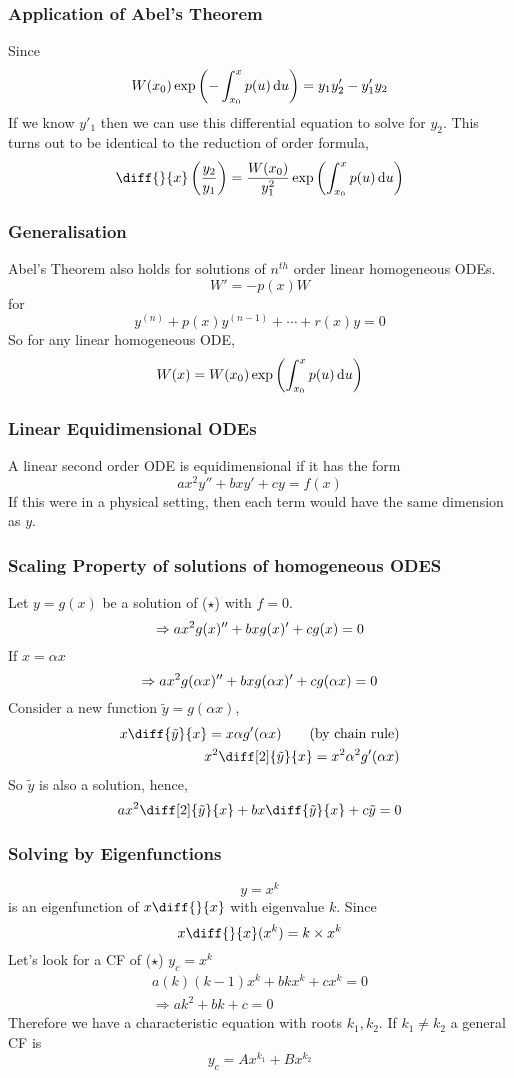 \documentclass{article}
\begin{document}
\subsubsection*{Application of Abel's Theorem}
Since
\[
    W(x_0) \exp \left( -\int_{x_0}^{x}{p(u) \mathop{}\!\mathrm{d} u} \right) = y_1 y_2' - y'_1 y_2
\]
If we know $y'_1$ then we can use this differential equation to solve for $y_2$.
This turns out to be identical to the reduction of order formula,
\[
    \diff {}{x} \bkt{\frac{y_2}{y_1}} = \frac{W(x_0)}{y_1^2} \exp \bkt{\int_{x_0}^{x}{p(u) \diffd u}} 
\]
\subsubsection*{Generalisation}
Abel's Theorem also holds for solutions of $n^{th}$ order linear homogeneous ODEs.
\[
    W' = -p(x)W 
\]
for
\[
    y^{(n)} + p(x) y^{(n-1)} + \cdots + r(x) y = 0
\]
So for any linear homogeneous ODE,
\[
    W(x) = W(x_0) \exp \left( \int_{x_0}^{x}{p(u) \mathop{}\!\mathrm{d} u} \right)
\]
\subsubsection{Linear Equidimensional ODEs}
\begin{defi}
    A linear second order ODE is equidimensional if it has the form 
    \[
        a x^2 y'' + bx y' + cy = f(x) \tag{$\star$}  
    \]
    If this were in a physical setting, then each term would have the same dimension as $y$.
\end{defi}
\subsubsection*{Scaling Property of solutions of homogeneous ODES}
Let $y = g(x)$ be a solution of ($\star$) with $f = 0$.
\[
    \Rightarrow  a x^2 g(x)'' + bx g(x)' + cg(x) = 0 \\
\]
If $x = \alpha x$
\[
    \Rightarrow  a x^2 g(\alpha x)'' + bx g(\alpha x)' + cg(\alpha x) = 0 \\
\]
Consider a new function $\tilde{y} = g(\alpha x)$,
\begin{align*}
    x \diff {\tilde{y}}{x} = x \alpha g'(\alpha x) \tag{by chain rule}\\
    x^2 \diff[2] {\tilde{y}}{x} = x^2 \alpha^2 g'(\alpha x)
\end{align*}
So $\tilde{y}$ is also a solution, hence,
\[
    a x^2 \diff[2]{\tilde{y}}{x} + bx \diff{\tilde{y}}{x} + c\tilde{y} = 0
\]
\subsubsection*{Solving by Eigenfunctions}
\[
    y = x^k  
\]
is an eigenfunction of $x \diff{}{x}$ with eigenvalue $k$. Since
\[
    x \diff{}{x}(x^k) = k \times x^k
\]
Let's look for a CF of ($\star$) $y_c = x^k$
\begin{align*}
    a (k)(k-1) x^k + b k x^k +  c x^k = 0 \\
    \Rightarrow ak^2 + bk + c = 0
\end{align*}
Therefore we have a characteristic equation with roots $k_1, k_2$.
If $k_1 \neq k_2$ a general CF is
\[
    y_c = A x^{k_1} + B x^{k_2}
\]
\end{document}
